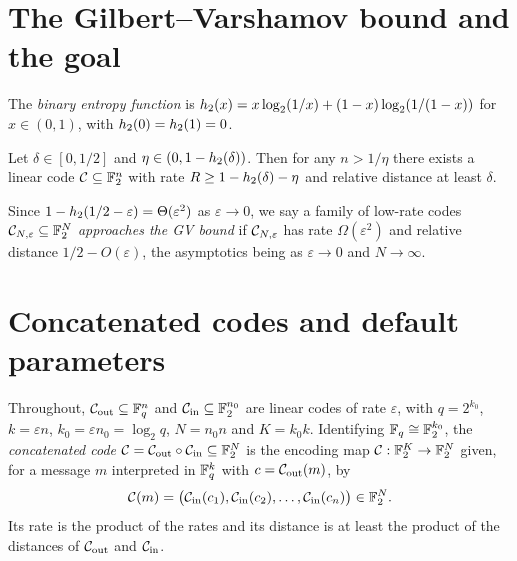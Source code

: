 \section{The Gilbert--Varshamov bound and the goal}

\begin{definition}
  \label{def:binary-entropy}
  \mathlibok
  The \emph{binary entropy function} is
  $h_2(x) = x\log_2(1/x) + (1-x)\log_2(1/(1-x))$ for $x \in (0,1)$, with
  $h_2(0)=h_2(1)=0$.
\end{definition}

\begin{theorem}
  \label{thm:gv-bound}
  \notready
  Let $\delta \in [0,1/2]$ and $\eta \in (0, 1 - h_2(\delta))$. Then for any
  $n > 1/\eta$ there exists a linear code $\mathcal{C} \subseteq \mathbb{F}_2^n$ with rate
  $R \geq 1 - h_2(\delta) - \eta$ and relative distance at least $\delta$.
\end{theorem}

\begin{definition}
  \label{def:approaching-gv}
  Since $1 - h_2(1/2 - \varepsilon) = \Theta(\varepsilon^2)$ as
  $\varepsilon \to 0$, we say a family of low-rate codes
  $\mathcal{C}_{N,\varepsilon} \subseteq \mathbb{F}_2^N$ \emph{approaches the GV bound} if
  $\mathcal{C}_{N,\varepsilon}$ has rate $\Omega(\varepsilon^2)$ and relative distance
  $1/2 - O(\varepsilon)$, the asymptotics being as $\varepsilon \to 0$ and
  $N \to \infty$.
\end{definition}

\section{Concatenated codes and default parameters}

\begin{definition}
  \label{constr:concatenation}
  Throughout, $\mathcal{C}_{\mathrm{out}} \subseteq \mathbb{F}_q^n$ and $\mathcal{C}_{\mathrm{in}} \subseteq \mathbb{F}_2^{n_0}$ are linear
  codes of rate $\varepsilon$, with $q = 2^{k_0}$, $k = \varepsilon n$,
  $k_0 = \varepsilon n_0 = \log_2 q$, $N = n_0 n$ and $K = k_0 k$. Identifying
  $\mathbb{F}_q \cong \mathbb{F}_2^{k_0}$, the \emph{concatenated code}
  $\mathcal{C} = \mathcal{C}_{\mathrm{out}} \circ \mathcal{C}_{\mathrm{in}} \subseteq \mathbb{F}_2^N$ is the encoding map
  $\mathcal{C} : \mathbb{F}_2^K \to \mathbb{F}_2^N$ given, for a message $m$ interpreted in
  $\mathbb{F}_q^k$ with $c = \mathcal{C}_{\mathrm{out}}(m)$, by
  \[
    \mathcal{C}(m) = \big(\mathcal{C}_{\mathrm{in}}(c_1), \mathcal{C}_{\mathrm{in}}(c_2), \dots, \mathcal{C}_{\mathrm{in}}(c_n)\big) \in \mathbb{F}_2^N.
  \]
  Its rate is the product of the rates and its distance is at least the product
  of the distances of $\mathcal{C}_{\mathrm{out}}$ and $\mathcal{C}_{\mathrm{in}}$.
\end{definition}

